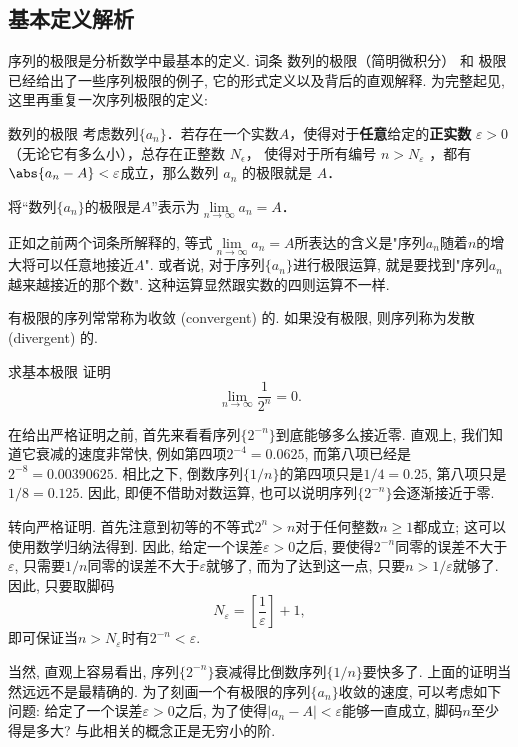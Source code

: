 

\subsection{基本定义解析}

序列的极限是分析数学中最基本的定义. 词条 数列的极限（简明微积分） 和 极限 已经给出了一些序列极限的例子, 它的形式定义以及背后的直观解释. 为完整起见, 这里再重复一次序列极限的定义:

\begin{definition}{数列的极限}
考虑数列$\{a_n\}$．若存在一个实数$A$，使得对于\textbf{任意}给定的\textbf{正实数} $\varepsilon > 0$（无论它有多么小），总存在正整数 $N_\epsilon$， 使得对于所有编号 $n>N_\varepsilon$ ，都有 $\abs{a_n - A} < \varepsilon$成立，那么数列 $a_n$ 的极限就是 $A$．

将“数列$\{a_n\}$的极限是$A$”表示为$\lim\limits_{n\to\infty}a_n=A$．
\end{definition}

正如之前两个词条所解释的, 等式$\lim\limits_{n\to\infty}a_n=A$所表达的含义是"序列$a_n$随着$n$的增大将可以任意地接近$A$". 或者说, 对于序列$\{a_n\}$进行极限运算, 就是要找到"序列$a_n$越来越接近的那个数". 这种运算显然跟实数的四则运算不一样.

有极限的序列常常称为收敛 (convergent) 的. 如果没有极限, 则序列称为发散 (divergent) 的.

\begin{example}{求基本极限}
证明$$\lim\limits_{n\to\infty}\frac{1}{2^n}=0.$$

在给出严格证明之前, 首先来看看序列$\{2^{-n}\}$到底能够多么接近零. 直观上, 我们知道它衰减的速度非常快, 例如第四项$2^{-4}=0.0625$, 而第八项已经是$2^{-8}=0.00390625$. 相比之下, 倒数序列$\{1/n\}$的第四项只是$1/4=0.25$, 第八项只是$1/8=0.125$. 因此, 即便不借助对数运算, 也可以说明序列$\{2^{-n}\}$会逐渐接近于零.

转向严格证明. 首先注意到初等的不等式$2^n>n$对于任何整数$n\geq1$都成立; 这可以使用数学归纳法得到. 因此, 给定一个误差$\varepsilon>0$之后, 要使得$2^{-n}$同零的误差不大于$\varepsilon$, 只需要$1/n$同零的误差不大于$\varepsilon$就够了, 而为了达到这一点, 只要$n>1/\varepsilon$就够了. 因此, 只要取脚码
$$
N_\varepsilon=\left[\frac{1}{\varepsilon}\right]+1,
$$
即可保证当$n>N_\varepsilon$时有$2^{-n}<\varepsilon$.
\end{example}

当然, 直观上容易看出, 序列$\{2^{-n}\}$衰减得比倒数序列$\{1/n\}$要快多了. 上面的证明当然远远不是最精确的. 为了刻画一个有极限的序列$\{a_n\}$收敛的速度, 可以考虑如下问题: 给定了一个误差$\varepsilon>0$之后, 为了使得$|a_n-A|<\varepsilon$能够一直成立, 脚码$n$至少得是多大? 与此相关的概念正是无穷小的阶. 

